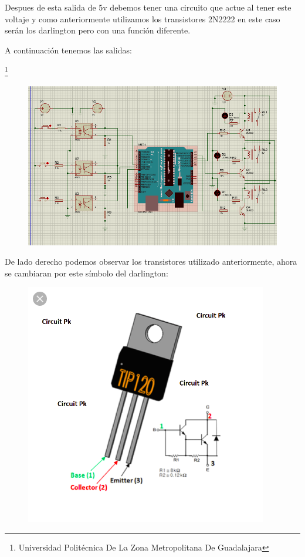 \documentclass[11pt,a4paper]{article}
\begin{document}
Despues de esta salida de 5v debemos tener una circuito que actue al tener este voltaje y como anteriormente utilizamos los transistores 2N2222 en este caso serán los darlington pero con una función diferente.

A continuación tenemos las salidas:

\footnote{Universidad Politécnica De La Zona Metropolitana De Guadalajara} 

\newpage

\begin{figure}[hbtp]
\centering
\includegraphics[scale=0.80]{3.png}
\end{figure}

De lado derecho podemos observar los transistores utilizado anteriormente, ahora se cambiaran por este símbolo del darlington:

\begin{figure}[hbtp]
\centering
\includegraphics[scale=0.50]{1.png}
\end{figure}
\end{document}
